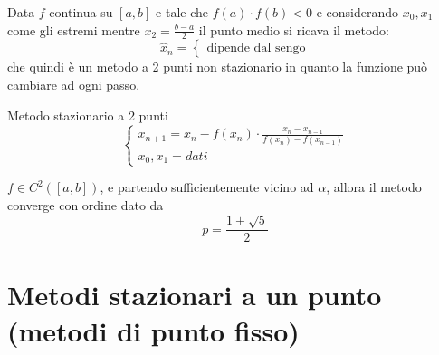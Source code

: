 \documentclass[12pt,a4paper,]{report}
\begin{document}
\begin{metodo}
    Data $f$ continua su $[a,b]$ e tale che $f(a)\cdot f(b) < 0$ e considerando $x_0, x_1$ come gli estremi mentre $x_2=\frac{b-a}{2}$ il punto medio si ricava il metodo:
    \[
    \hat{x}_n = 
    \begin{cases}
        \text{dipende dal sengo}
    \end{cases}
    \]
    che quindi è un metodo a 2 punti non stazionario in quanto la funzione può cambiare ad ogni passo.
\end{metodo}
\begin{metodo}
    Metodo stazionario a 2 punti
    \[
    \begin{cases}
        x_{n+1} = x_n - f(x_n) \cdot \frac{x_n - x_{n-1}}{f(x_n) - f(x_{n-1})} \\
        x_0,x_1 = dati
    \end{cases}
    \]
\end{metodo}
\begin{teorema}
    $f \in C^2([a, b])$, e partendo sufficientemente vicino ad $\alpha$, allora il metodo converge con ordine dato da
    \[p = \frac{1 + \sqrt{5}}{2}\]
\end{teorema}

\section{Metodi stazionari a un punto (metodi di punto fisso)}
\label{sec: punto fisso}
\end{document}
